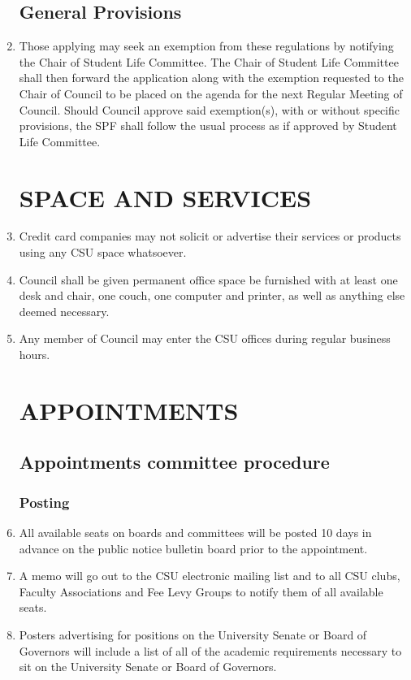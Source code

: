 \documentclass[oneside]{book}
\begin{document}
\begin{enumerate}
\chapter{\label{SPF_General_Provisions}General Provisions}

\item Those applying may seek an exemption from these regulations by notifying the Chair of Student Life Committee. The Chair of Student Life Committee shall then forward the application along with the exemption requested to the Chair of Council to be placed on the agenda for the next Regular Meeting of Council. Should Council approve said exemption(s), with or without specific provisions, the SPF shall follow the usual process as if approved by Student Life Committee. 



\part{\label{SPACE_AND_SERVICES}SPACE AND SERVICES }
\item Credit card companies may not solicit or advertise their services
or products using any CSU space whatsoever. 
\item Council shall be given permanent office space be furnished with at
least one desk and chair, one couch, one computer and printer, as
well as anything else deemed necessary. 
\item Any member of Council may enter the CSU offices during regular business
hours. 

\part{\label{APPOINTMENTS}APPOINTMENTS }


\chapter{\label{Appointments_committee_procedure}Appointments committee procedure }


\section{\label{Posting}Posting }
\item All available seats on boards and committees will be posted 10 days
in advance on the public notice bulletin board prior to the appointment. 
\item A memo will go out to the CSU electronic mailing list and to all CSU
clubs, Faculty Associations and Fee Levy Groups to notify them of
all available seats. 
\item Posters advertising for positions on the University Senate or Board
of Governors will include a list of all of the academic requirements
necessary to sit on the University Senate or Board of Governors. 


\end{enumerate}
\end{document}
